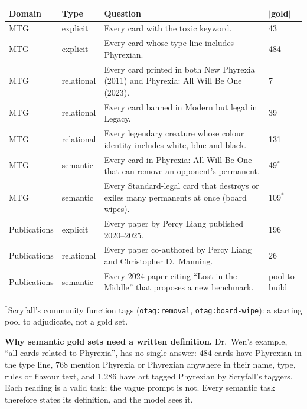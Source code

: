 \documentclass[10pt]{article}
\begin{document}
{\small
\begin{tabularx}{\linewidth}{@{}L{2.3cm}L{1.6cm}YL{1.1cm}@{}}
\toprule
Domain & Type & Question & $|$gold$|$ \\
\midrule
MTG & explicit & Every card with the toxic keyword. & 43 \\
MTG & explicit & Every card whose type line includes Phyrexian. & 484 \\
MTG & relational & Every card printed in both New Phyrexia (2011) and Phyrexia: All Will Be One (2023). & 7 \\
MTG & relational & Every card banned in Modern but legal in Legacy. & 39 \\
MTG & relational & Every legendary creature whose colour identity includes white, blue and black. & 131 \\
MTG & semantic & Every card in Phyrexia: All Will Be One that can remove an opponent's permanent. & 49$^*$ \\
MTG & semantic & Every Standard-legal card that destroys or exiles many permanents at once (board wipes). & 109$^*$ \\
Publications & explicit & Every paper by Percy Liang published 2020--2025. & 196 \\
Publications & relational & Every paper co-authored by Percy Liang and Christopher D.\ Manning. & 26 \\
Publications & semantic & Every 2024 paper citing ``Lost in the Middle'' that proposes a new benchmark. & pool to build \\
\bottomrule
\end{tabularx}}\par
{\footnotesize $^*$Scryfall's community function tags (\texttt{otag:removal}, \texttt{otag:board-wipe}): a starting
pool to adjudicate, not a gold set.}

\textbf{Why semantic gold sets need a written definition.} Dr.\ Wen's example, ``all cards related to Phyrexia'',
has no single answer: 484 cards have Phyrexian in the type line, 768 mention Phyrexia or Phyrexian anywhere in their name,
type, rules or flavour text, and 1,286 have art tagged Phyrexian by Scryfall's taggers. Each reading is a valid
task; the vague prompt is not. Every semantic task therefore states its definition, and the model sees it.
\end{document}
